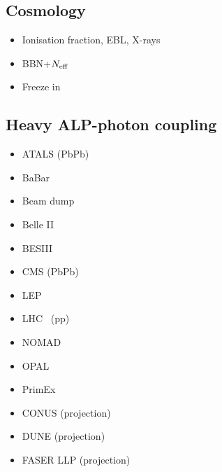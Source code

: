 \documentclass[9pt,twocolumn]{extarticle}
\begin{document}
\begin{mdframed}[everyline=true]
\subsection*{Cosmology}\vspace{-0.5em}
\begin{itemize}\setlength\itemsep{-0.5em}
    \item Ionisation fraction, EBL, X-rays~\cite{Cadamuro:2011fd}
    \item BBN+$N_{\rm eff}$~\cite{Depta:2020wmr}
    \item Freeze in~\cite{Langhoff:2022bij}
\end{itemize}
\end{mdframed}

\newpage

\begin{mdframed}
\vspace{-1em}
\section{Heavy ALP-photon coupling}\vspace{-0.5em}
\begin{itemize}\setlength\itemsep{-0.5em}
    \item ATALS (PbPb)~\cite{ATLAS:2020hii}
    \item BaBar~\cite{Dolan:2017osp}
    \item Beam dump~\cite{CHARM:1985anb,Riordan:1987aw,Dolan:2017osp,Blumlein:1990ay,NA64:2020qwq}
    \item Belle II~\cite{Belle-II:2020jti}
    \item BESIII~\cite{BESIII:2022rzz}
    \item CMS (PbPb)~\cite{CMS:2018erd}
    \item LEP~\cite{Jaeckel:2015jla}
    \item LHC~ (pp)\cite{Knapen:2016moh}
    \item NOMAD~\cite{NOMAD:2000usb}
	 \item OPAL~\cite{Knapen:2016moh}
	 \item PrimEx~\cite{PrimEx:2010fvg,Aloni:2019ruo}
	     \item CONUS (projection)~\cite{Dent:2019ueq}
    \item DUNE (projection)~\cite{Brdar:2020dpr}
    \item FASER LLP (projection)~\cite{FASER:2018eoc}
\end{itemize}
\end{mdframed}
\end{document}
